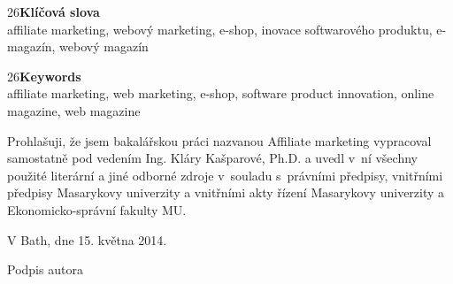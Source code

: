 \documentclass[12pt,twoside,openany]{fithesis}
\begin{document}
\vspace{15mm}

\fontsize{18} {26}\textbf{Klíčová slova}
\vspace{3mm}
      \\affiliate marketing, 
      webový marketing, 
      e-shop,
      inovace softwarového produktu,
      e-magazín,
      webový magazín
       
\vspace{5mm}
    
\fontsize{18} {26}\textbf{Keywords}
\vspace{3mm}
      \\affiliate marketing, 
      web marketing, 
      e-shop,
      software product innovation,
      online magazine,
      web magazine


\begin{ThesisDeclaration} %

\vspace{20mm}

Prohlašuji, že jsem bakalářskou práci nazvanou Affiliate marketing 
vypracoval samostatně 
pod vedením Ing. Kláry Kašparové, Ph.D. a uvedl v ní všechny použité 
literární a jiné odborné 
zdroje v souladu s právními předpisy, vnitřními předpisy Masarykovy 
univerzity a vnitřními akty 
řízení Masarykovy univerzity a Ekonomicko-správní fakulty MU.

\vspace{20mm}

V Bath, dne 15. května 2014. \hspace{40mm}\hrulefill 

\hspace{105mm} Podpis autora

\end{ThesisDeclaration}

\DeclareRobustCommand{\gobblefive}[5]{}
\newcommand*{\SkipTocEntry}{\addtocontents{toc}{\gobblefive}}
\end{document}
